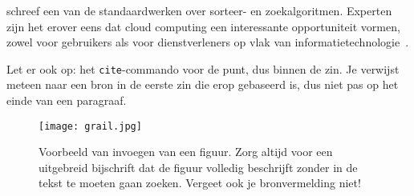 \textcite{Knuth1998} schreef een van de standaardwerken over sorteer- en zoekalgoritmen. Experten zijn het erover eens dat cloud computing een interessante opportuniteit vormen, zowel voor gebruikers als voor dienstverleners op vlak van informatietechnologie~\autocite{Creeger2009}.

Let er ook op: het \texttt{cite}-commando voor de punt, dus binnen de zin. Je verwijst meteen naar een bron in de eerste zin die erop gebaseerd is, dus niet pas op het einde van een paragraaf.

\begin{figure}
    \centering
    \texttt{[image: grail.jpg]}
    \caption[Voorbeeld figuur.]{\label{fig:grail}Voorbeeld van invoegen van een figuur. Zorg altijd voor een uitgebreid bijschrift dat de figuur volledig beschrijft zonder in de tekst te moeten gaan zoeken. Vergeet ook je bronvermelding niet!}
\end{figure}